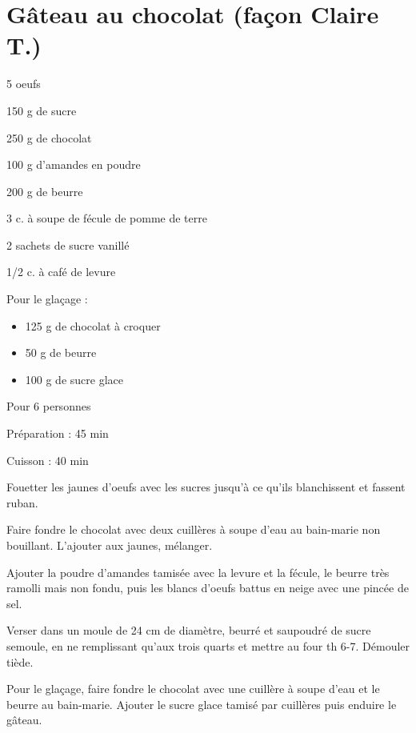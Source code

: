 \section[\normalsize{Gâteau au chocolat (façon Claire T.)}]{Gâteau au chocolat (façon Claire T.)}

\begin{ingredients}
\item 5 oeufs
\item 150 g de sucre
\item 250 g de chocolat
\item 100 g d'amandes en poudre
\item 200 g de beurre
\item 3 c. \`a soupe de f\'ecule de pomme de terre
\item 2 sachets de sucre vanill\'e
\item 1/2 c. \`a caf\'e de levure
\item Pour le glaçage :
\begin{itemize}
\item 125 g de chocolat \`a croquer
\item 50 g de beurre
\item 100 g de sucre glace
\end{itemize}
\end{ingredients}
\begin{infos}
\item Pour 6 personnes
\item Préparation : 45 min
\item Cuisson : 40 min
\end{infos}
\begin{etapes}
\item Fouetter les jaunes d'oeufs avec les sucres jusqu'\`a ce qu'ils blanchissent et fassent ruban.
\item Faire fondre le chocolat avec deux cuill\`eres \`a soupe d'eau au bain-marie non bouillant. L'ajouter aux jaunes, m\'elanger.
\item Ajouter la poudre d'amandes tamis\'ee avec la levure et la f\'ecule, le beurre tr\`es ramolli mais non fondu, puis les blancs d'oeufs battus en neige avec une pinc\'ee de sel.
\item Verser dans un moule de 24 cm de diam\`etre, beurr\'e et saupoudr\'e de sucre semoule, en ne remplissant qu'aux trois quarts et mettre au four th 6-7. D\'emouler ti\`ede.
\item Pour le glaçage, faire fondre le chocolat avec une cuill\`ere \`a soupe d'eau et le beurre au bain-marie. Ajouter le sucre glace tamis\'e par cuill\`eres puis enduire le g\^ateau.
\end{etapes}
\begin{conseils}
\end{conseils}
